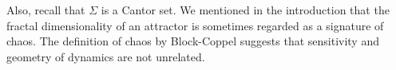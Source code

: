 \documentclass[10pt,twoside]{book}
\begin{document}
Also, recall that $\Sigma$ is a Cantor set.
We mentioned in the introduction that the fractal dimensionality of an attractor is sometimes regarded as a signature of chaos.
The definition of chaos by Block-Coppel suggests that sensitivity and geometry of dynamics are not unrelated.





\printindex
\end{document}
